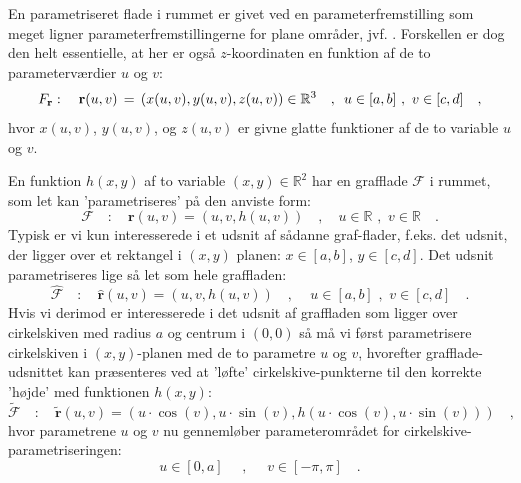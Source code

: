 En parametriseret {flade i rummet} er givet ved en
parameterfremstilling som meget lig\-ner parameterfremstillingerne for plane områder, jvf. .  Forskellen er dog den helt essentielle, at
her er også $z$-koordinaten en funktion af de to parameterværdier $u$ og $v$:
\begin{equation}
\label{eqFr}
F_{\bf r}: \quad {\bf r}(u,v) \, = \, \left(x(u,v), y(u,v),
z(u,v)\right) \in \mathbb{R}^3 \quad , \, \, \,  u \in [a,b] \, \,
, \, \,  v \in [c,d] \quad,
\end{equation}
hvor $x(u,v)$, $y(u,v)$, og $z(u,v)$ er givne glatte  funktioner af de to variable $u$ og $v$.


\begin{example} \label{exampGrafflad}
En funktion $h(x,y)$  af to variable $(x,y) \in \mathbb{R}^{2}$ har en grafflade $\mathcal{F}$ i rummet, som let kan 'parametriseres' på den anviste form:
\begin{equation}
\mathcal{F} \quad : \quad \mathbf{r}(u,v) = (u, v, h(u,v)) \quad , \quad  u \in \mathbb{R} \, \,
, \, \,  v \in \mathbb{R} \quad.
\end{equation}
Typisk er vi kun interesserede i et udsnit af sådanne graf-flader, f.eks. det udsnit, der ligger over et rektangel i $(x,y)$ planen:
$x \in [a,b]$,
$ y \in [c,d]$. Det udsnit parametriseres lige så let som hele graffladen:
\begin{equation}
\widehat{\mathcal{F}} \quad : \quad \widehat{\mathbf{r}}(u,v) = (u, v, h(u,v)) \quad , \quad  \,  u \in [a,b] \, \,
, \, \,  v \in [c,d] \quad.
\end{equation}
Hvis vi derimod er interesserede i det udsnit af graffladen som ligger over cirkelskiven med radius $a$ og centrum i $(0,0)$ så må vi først  parametrisere cirkelskiven i $(x, y)$-planen med de to  parametre $u$ og $v$, hvorefter grafflade-udsnittet kan præsenteres ved at 'løfte' cirkelskive-punkterne til den kor\-rek\-te 'højde' med funktionen $h(x,y)$:
\begin{equation}
\widetilde{\mathcal{F}} \quad : \quad \widetilde{\mathbf{r}}(u,v) = \left(u\cdot \cos(v), u\cdot \sin(v), h\left(u\cdot \cos(v), u\cdot \sin(v)\right)\right) \quad ,
\end{equation}
hvor parametrene $u$ og $v$ nu gennemløber parameterområdet for cirkelskive-parametriseringen:
\begin{equation}
 u \in [0, a] \, \, \quad
, \, \, \quad  v \in [-\pi, \pi] \quad.
\end{equation}
\end{example}


